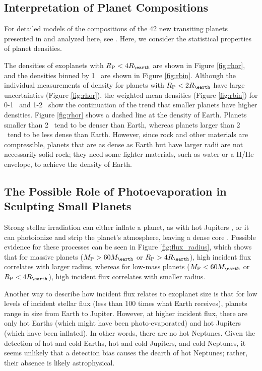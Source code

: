 \documentclass[11pt]{aastex}
\newcommand{\rspecial}{4 \rearth}
\begin{document}
\subsection{Interpretation of Planet Compositions}
For detailed models of the compositions of the 42 new transiting planets presented in \citet{Marcy2013} and analyzed here, see \citet{Rogers2013}.  Here, we consider the statistical properties of planet densities.

The densities of exoplanets with $\rpl < \rspecial$ are shown in Figure \ref{fig:rhor}, and the densities binned by 1 \rearth\ are shown in Figure \ref{fig:rbin}.  Although the individual measurements of density for planets with $\rpl < 2 \rearth$ have large uncertainties (Figure \ref{fig:rhor}), the weighted mean densities (Figure \ref{fig:rbin}) for 0-1 \rearth\ and 1-2 \rearth\ show the continuation of the trend that smaller planets have higher densities.  Figure \ref{fig:rhor} shows a dashed line at the density of Earth.  Planets smaller than 2 \rearth\ tend to be denser than Earth, whereas planets larger than 2 \rearth\ tend to be less dense than Earth.  However, since rock and other materials are compressible, planets that are as dense as Earth but have larger radii are not necessarily solid rock; they need some lighter materials, such as water or a H/He envelope, to achieve the density of Earth.

\subsection{The Possible Role of Photoevaporation in Sculpting Small Planets}
Strong stellar irradiation can either inflate a planet, as with hot Jupiters \citep{Seager2007}, or it can photoionize and strip the planet's atmosphere, leaving a dense core \citep{Lopez2012}.  Possible evidence for these processes can be seen in Figure \ref{fig:flux_radius}, which shows that for massive planets ($\mpl > 60 \mearth $ or $\rpl > \rspecial$), high incident flux correlates with larger radius, whereas for low-mass planets ($\mpl < 60 \mearth $ or $\rpl < \rspecial$), high incident flux correlates with smaller radius.

Another way to describe how incident flux relates to exoplanet size is that for low levels of incident stellar flux (less than 100 times what Earth receives), planets range in size from Earth to Jupiter.  However, at higher incident flux, there are only hot Earths (which might have been photo-evaporated) and hot Jupiters (which have been inflated).  In other words, there are no hot Neptunes.  Given the detection of hot and cold Earths, hot and cold Jupiters, and cold Neptunes, it seems unlikely that a detection bias causes the dearth of hot Neptunes; rather, their absence is likely astrophysical.
\end{document}
